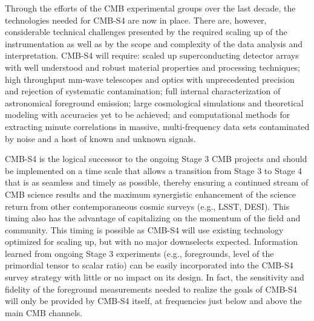 Through the efforts of the CMB experimental groups over the last decade, the technologies needed for CMB-S4 are now in place. There are, however, considerable technical challenges presented by the required scaling up of the instrumentation as well as by the scope and complexity of the data analysis and interpretation.  CMB-S4 will require: scaled up superconducting detector arrays with well understood and robust material properties and processing techniques; high throughput mm-wave telescopes and optics with unprecedented precision and rejection of systematic contamination; full internal characterization of astronomical foreground emission; large cosmological simulations and theoretical modeling with accuracies yet to be achieved; and computational methods for extracting minute correlations in massive, multi-frequency data sets contaminated by noise and a host of known and unknown signals. 


CMB-S4 is the logical successor to the ongoing Stage 3 CMB projects and should be implemented on a time scale that allows a transition from Stage 3 to Stage 4 that is as seamless and timely as possible,  thereby ensuring a continued  stream of CMB science results and the maximum synergistic enhancement of the science return from other contemporaneous cosmic surveys (e.g., LSST, DESI).  This timing also has the advantage of capitalizing on the momentum of the field and community.  This timing is possible as CMB-S4 will use existing technology optimized for scaling up, but with no major downselects expected.  Information learned from ongoing Stage 3 experiments (e.g., foregrounds, level of the primordial tensor to scalar ratio) can be easily incorporated into the CMB-S4 survey strategy with little or no impact on its design. In fact, the sensitivity and fidelity of the foreground measurements needed to realize the goals of CMB-S4 will only be provided by CMB-S4 itself, at frequencies just below and above the main CMB channels.
\eject

 
